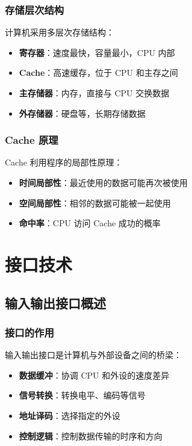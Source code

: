 \documentclass[12pt,UTF8]{ctexbook}
\begin{document}
\section{存储层次结构}

计算机采用多层次存储结构：

\begin{itemize}[leftmargin=2cm]
    \item \textbf{寄存器}：速度最快，容量最小，CPU 内部
    \item \textbf{Cache}：高速缓存，位于 CPU 和主存之间
    \item \textbf{主存储器}：内存，直接与 CPU 交换数据
    \item \textbf{外存储器}：硬盘等，长期存储数据
\end{itemize}

\section{Cache 原理}

Cache 利用程序的局部性原理：

\begin{itemize}[leftmargin=2cm]
    \item \textbf{时间局部性}：最近使用的数据可能再次被使用
    \item \textbf{空间局部性}：相邻的数据可能被一起使用
    \item \textbf{命中率}：CPU 访问 Cache 成功的概率
\end{itemize}

\part{接口技术}

\chapter{输入输出接口概述}
\label{chap:i_o_interface}

\section{接口的作用}

输入输出接口是计算机与外部设备之间的桥梁：

\begin{itemize}[leftmargin=2cm]
    \item \textbf{数据缓冲}：协调 CPU 和外设的速度差异
    \item \textbf{信号转换}：转换电平、编码等信号
    \item \textbf{地址译码}：选择指定的外设
    \item \textbf{控制逻辑}：控制数据传输的时序和方向
\end{itemize}
\end{document}
